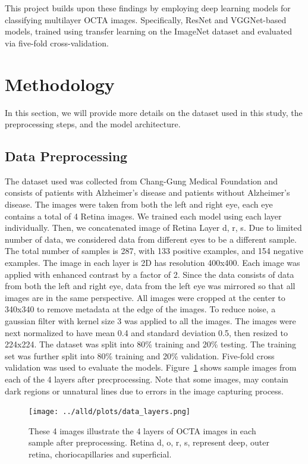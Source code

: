 \documentclass{article} %
\begin{document}
This project builds upon these findings by employing deep learning models for classifying multilayer OCTA images. Specifically, ResNet and VGGNet-based models, trained using transfer learning on the ImageNet dataset and evaluated via five-fold cross-validation.

\section{Methodology}
In this section, we will provide more details on the dataset used in this study, the preprocessing steps, and the model architecture.
\subsection{Data Preprocessing}
The dataset used was collected from Chang-Gung Medical Foundation and consists of patients with Alzheimer's disease and patients without Alzheimer's disease. The images were taken from both the left and right eye, each eye contains a total of 4 Retina images. We trained each model using each layer individually. Then, we concatenated image of Retina Layer d, r, s. Due to limited number of data, we considered data from different eyes to be a different sample. The total number of samples is 287, with 133 positive examples, and 154 negative examples. The image in each layer is 2D has resolution 400x400. Each image was applied with enhanced contrast by a factor of 2. Since the data consists of data from both the left and right eye, data from the left eye was mirrored so that all images are in the same perspective. All images were cropped at the center to 340x340 to remove metadata at the edge of the images. To reduce noise, a gaussian filter with kernel size 3 was applied to all the images. The images were next normalized to have mean 0.4 and standard deviation 0.5, then resized to 224x224. The dataset was split into 80\% training and 20\% testing. The training set was further split into 80\% training and 20\% validation. Five-fold cross validation was used to evaluate the models. Figure~\ref{fig:layer-images} shows sample images from each of the 4 layers after precprocessing. Note that some images, may contain dark regions or unnatural lines due to errors in the image capturing process.

\begin{figure}[h]
\begin{center}
\texttt{[image: ../alld/plots/data\_layers.png]}
\end{center}
\caption{These 4 images illustrate the 4 layers of OCTA images in each sample after preprocessing. Retina d, o, r, s, represent deep, outer retina, choriocapillaries and superficial.}
\label{fig:layer-images}
\end{figure}
\end{document}
